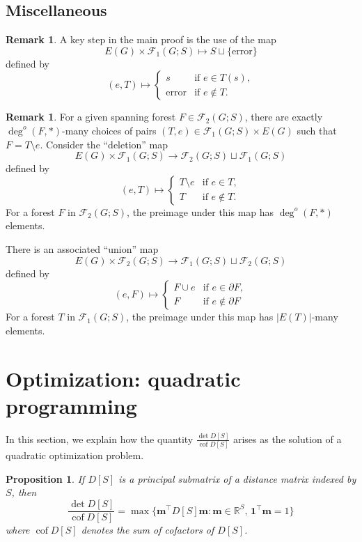\documentclass{amsart}
\newtheorem{prop}[thm]{Proposition}
\theoremstyle{definition}
\newtheorem{rmk}[thm]{Remark}
\newcommand{\RR}{\mathbb{R}}
\newcommand{\bone}{\mathbf{1}}
\newcommand{\boldm}{\mathbf{m}}
\newcommand{\tr}{\intercal}
\DeclareMathOperator{\cof}{cof}
\newcommand{\trees}{\mathcal{F}_1}
\newcommand{\forests}{\mathcal{F}}
\newcommand{\degout}{\deg^o}
\newcommand{\note}[1]{{\color{red} \sf $\diamondsuit$  {#1} $\diamondsuit$ }}
\begin{document}
\subsection{Miscellaneous}


\begin{rmk}
A key step in the main proof is the use of the map
\[
	E(G) \times \trees(G;S) \mapsto S \sqcup \{\text{error}\}
\]
defined by
\[
	(e, T) \mapsto \begin{cases}
		s &\text{if } e \in T(s), \\
		\text{error} &\text{if } e \not\in T .
	\end{cases}
\]
\end{rmk}

\begin{rmk}
For a given spanning forest
$F \in \forests_2(G;S)$,
there are exactly $\degout(F, *)$-many choices of pairs $(T,e) \in \trees(G;S) \times E(G)$ such that
$F = T \setminus e.$
Consider the ``deletion'' map
\[
	E(G) \times \trees(G;S) \to \forests_2(G;S) \sqcup \trees(G;S)
\]
defined by
\[
	(e, T) \mapsto \begin{cases}
	T \setminus e &\text{if } e\in T,\\
	T &\text{if } e\not\in T.
	\end{cases}
\]
For a forest $F$ in $\forests_2(G;S)$,
the preimage under this map has $\degout(F,*)$ elements.

There is an associated ``union'' map 
\[
	E(G) \times \forests_2(G;S) \longrightarrow \trees(G;S) \sqcup \forests_2(G;S)
\]
defined by
\[
	(e, F) \mapsto \begin{cases}
		F \cup e &\text{if } e \in \partial F, \\
		F &\text{if } e \not\in \partial F
	\end{cases}
\]
For a forest $T$ in $\trees(G; S)$, the preimage under this map has $|E(T)|$-many elements.
\end{rmk}


\section{Optimization: quadratic programming}
\label{sec:optimization}

In this section, we explain how the quantity $\displaystyle \frac{\det D[S]}{\cof D[S]}$ arises as the solution of a quadratic optimization problem.


\begin{prop}
\label{prop:optimization}
If $D[S]$ is a principal submatrix of a distance matrix indexed by $S$, then 
\[
	\frac{\det D[S]}{\cof D[S]} = \max \{\boldm^\tr D[S] \boldm : \boldm \in \RR^S,\, \bone^\tr \boldm = 1 \}
\]
where $\cof D[S]$ denotes the sum of cofactors of $D[S]$.
\end{prop}
\end{document}
